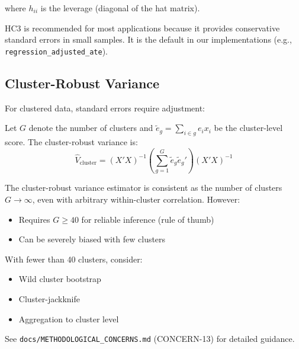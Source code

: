 where $h_{ii}$ is the leverage (diagonal of the hat matrix).

\begin{insight}
HC3 is recommended for most applications because it provides conservative standard errors in small samples. It is the default in our implementations (e.g., \texttt{regression\_adjusted\_ate}).
\end{insight}

\subsection{Cluster-Robust Variance}

For clustered data, standard errors require adjustment:

\begin{definition}
\label{def:cluster_var}
Let $G$ denote the number of clusters and $\tilde{e}_g = \sum_{i \in g} e_i x_i$ be the cluster-level score. The cluster-robust variance is:
\begin{equation}
\hat{V}_{\text{cluster}} = (X'X)^{-1} \left(\sum_{g=1}^{G} \tilde{e}_g \tilde{e}_g'\right) (X'X)^{-1}
\label{eq:cluster_var}
\end{equation}
\end{definition}

\begin{theorem}
\label{thm:cluster_consistent}
The cluster-robust variance estimator is consistent as the number of clusters $G \to \infty$, even with arbitrary within-cluster correlation. However:
\begin{itemize}
    \item Requires $G \geq 40$ for reliable inference (rule of thumb)
    \item Can be severely biased with few clusters
\end{itemize}
\end{theorem}

\begin{remark}
With fewer than 40 clusters, consider:
\begin{itemize}
    \item Wild cluster bootstrap \cite{cameron2008bootstrap}
    \item Cluster-jackknife
    \item Aggregation to cluster level
\end{itemize}
See \texttt{docs/METHODOLOGICAL\_CONCERNS.md} (CONCERN-13) for detailed guidance.
\end{remark}


